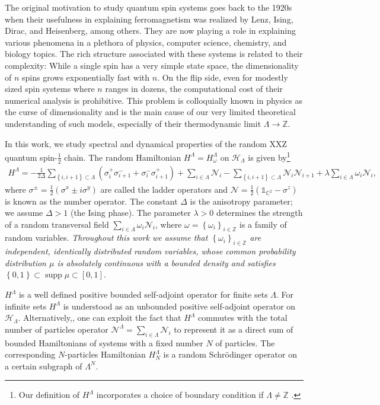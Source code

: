\documentclass[12pt, a4paper,reqno]{amsart}
\numberwithin{equation}{section}
\DeclareMathOperator{\supp}{supp}
\newcommand\C{\mathbb C}
\newcommand\Z{\mathbb Z}
\newcommand\cN{\mathcal{N}}
\newcommand\cH{\mathcal{H}}
\newcommand\be{\begin{equation}\begin{aligned}}
\newcommand\ee{\end{aligned}\end{equation}}
\newcommand{\set}[1]{\left\{ #1 \right\}}
\newcommand{\pa}[1]{\left( #1 \right)}
\newcommand\La{\Lambda}
\begin{document}
The original motivation to study quantum spin systems goes back to the 1920s when their usefulness in explaining ferromagnetism was realized by Lenz, Ising, Dirac, and Heisenberg, among others. They are now playing a role in explaining various phenomena in a plethora of physics, computer science, chemistry, and biology topics. The rich structure associated with these systems is related to their complexity: While a single spin has a very simple state space, the dimensionality of $n$ spins grows exponentially fast with $n$.  On the flip side, even for modestly sized spin systems where $n$ ranges in dozens, the computational cost of their numerical analysis is prohibitive. This problem is colloquially known in physics as the curse of dimensionality and is the main cause of our very limited theoretical understanding of such models, especially of their thermodynamic limit $\La\to\Z$. 


In this work, we study spectral and dynamical properties of the random XXZ quantum spin-$\frac 12$  chain. The   random Hamiltonian $H^\Lambda =H_\omega^\Lambda$ on $\cH_\La$  is given by\footnote{ Our definition of $H^\Lambda$ incorporates a choice of  boundary condition if  $\La\ne \Z$ .}   
\be\label{eq:H}
H^\Lambda=  -\tfrac{1}{2\Delta}\sum_{\set{i,i+1}\subset \Lambda} \pa{\sigma_i^+\sigma_{i+1}^-+\sigma_i^-\sigma_{i+1}^+}  + \sum_{i\in \Lambda} \mathcal{N}_i-\sum_{\set{i,i+1}\subset \Lambda} {\cN_i\cN_{i+1}} +\lambda\sum_{i\in \Lambda} \omega_i \mathcal{N}_i,
\ee 
where   $\sigma^\pm=\frac 12( \sigma^x \pm i \sigma^y)$ are called the ladder operators  and $\mathcal{N} = \tfrac{1}{2} (\mathds{1}_{\C^2}-\sigma^z)$ is known as the number operator. The constant  $\Delta$  is the anisotropy   parameter;   we assume $\Delta>1$  (the Ising phase). The parameter $\lambda>0$ determines the strength  of a random transversal field $\sum_{i\in \Lambda} \omega_i \mathcal{N}_i$, where $\omega = \set{\omega_i}_{i\in\Z}$  is a family of  random variables.  \emph{Throughout this work  we assume that  $\set{\omega_i}_{i\in\Z}$  are independent, identically distributed random variables, whose  common probability 
distribution $\mu$ is absolutely continuous with a bounded density and satisfies $\set{0,1}\subset \supp \mu\subset[0,1]$.}

$H^\La$ is a well defined  positive bounded self-adjoint operator for finite sets $\La$.  For infinite sets $H^\La$ is understood as an unbounded positive self-adjoint operator on $\mathcal H_\Lambda$.   Alternatively,, one can exploit the fact that  $H^\La$ commutes with the  total  number of particles operator $\cN^\La= \sum_{i\in \La} \cN_i$  to represent it as a direct sum of bounded Hamiltonians of systems with a fixed number $N$ of particles. The corresponding $N$-particles Hamiltonian $H^\La_N$ is a random Schr\"odinger operator on a certain subgraph of $\La^N$.
\end{document}
